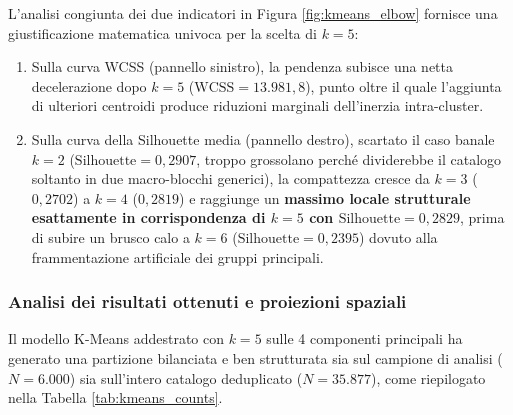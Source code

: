 L'analisi congiunta dei due indicatori in Figura \ref{fig:kmeans_elbow} fornisce una giustificazione matematica univoca per la scelta di \textbf{$k = 5$}:
\begin{enumerate}
    \item Sulla curva WCSS (pannello sinistro), la pendenza subisce una netta decelerazione dopo $k = 5$ ($\text{WCSS} = 13.981,8$), punto oltre il quale l'aggiunta di ulteriori centroidi produce riduzioni marginali dell'inerzia intra-cluster.
    \item Sulla curva della Silhouette media (pannello destro), scartato il caso banale $k=2$ ($\text{Silhouette} = 0,2907$, troppo grossolano perché dividerebbe il catalogo soltanto in due macro-blocchi generici), la compattezza cresce da $k=3$ ($0,2702$) a $k=4$ ($0,2819$) e raggiunge un \textbf{massimo locale strutturale esattamente in corrispondenza di $k = 5$ con $\text{Silhouette} = 0,2829$}, prima di subire un brusco calo a $k = 6$ ($\text{Silhouette} = 0,2395$) dovuto alla frammentazione artificiale dei gruppi principali.
\end{enumerate}

\subsubsection{Analisi dei risultati ottenuti e proiezioni spaziali}

Il modello K-Means addestrato con $k = 5$ sulle 4 componenti principali ha generato una partizione bilanciata e ben strutturata sia sul campione di analisi ($N = 6.000$) sia sull'intero catalogo deduplicato ($N = 35.877$), come riepilogato nella Tabella \ref{tab:kmeans_counts}.

\begin{table}[H]
\centering
\caption{Distribuzione numerica e percentuale dei brani nei 5 cluster K-Means (campione di analisi e intero catalogo deduplicato).}
\label{tab:kmeans_counts}
\vspace{0.2cm}
\end{table}

